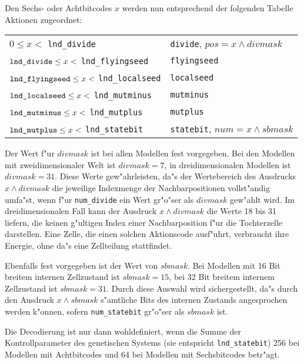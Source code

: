 Den Sechs- oder Achtbitcodes $x$ werden nun entsprechend der folgenden
Tabelle Aktionen zugeordnet:

\medskip
\begin{tabular}{l@{ $\rightarrow$ }l}
$0 \leq x <$ \verb|lnd_divide|                        & \verb|divide|, $pos = x \wedge \mathit{divmask}$ \\
$\verb|lnd_divide| \leq x <$ \verb|lnd_flyingseed|    & \verb|flyingseed| \\
$\verb|lnd_flyingseed| \leq x <$ \verb|lnd_localseed| & \verb|localseed| \\
$\verb|lnd_localseed| \leq x <$ \verb|lnd_mutminus|   & \verb|mutminus| \\
$\verb|lnd_mutminus| \leq x <$ \verb|lnd_mutplus|     & \verb|mutplus| \\
$\verb|lnd_mutplus| \leq x <$ \verb|lnd_statebit|     & \verb|statebit|, $num = x \wedge \mathit{sbmask}$ \\
\end{tabular}
\medskip

Der Wert f"ur $\mathit{divmask}$ ist bei allen Modellen fest vorgegeben. Bei
den Modellen mit zweidimensionaler Welt ist $\mathit{divmask} = 7$, in dreidimensionalen Modellen
ist $\mathit{divmask} = 31$. Diese Werte gew"ahrleisten, da"s der Wertebereich des Ausdrucks $x \wedge \mathit{divmask}$
die jeweilige Indexmenge der Nachbarpositionen vollst"andig umfa"st, wenn f"ur \verb|num_divide| ein
Wert gr"o"ser als $\mathit{divmask}$ gew"ahlt wird. Im dreidimensionalen Fall kann der Ausdruck
$x \wedge \mathit{divmask}$ die Werte 18 bis 31 liefern, die keinen g"ultigen Index einer Nachbarposition
f"ur die Tochterzelle darstellen. Eine Zelle, die einen solchen Aktionscode ausf"uhrt, verbraucht ihre
Energie, ohne da"s eine Zellteilung stattfindet.

Ebenfalls fest vorgegeben ist der Wert von $\mathit{sbmask}$. Bei Modellen mit 16 Bit breitem internen Zellzustand
ist $\mathit{sbmask} = 15$, bei 32 Bit breitem internem Zellzustand ist $\mathit{sbmask} = 31$. Durch diese Auswahl
wird sichergestellt, da"s durch den Ausdruck $x \wedge \mathit{sbmask}$ s"amtliche Bits des internen Zustands
angesprochen werden k"onnen, sofern \verb|num_statebit| gr"o"ser als $\mathit{sbmask}$ ist.

Die Decodierung ist nur dann wohldefiniert, wenn die Summe der Kontrollparameter des genetischen Systems
(sie entspricht \verb|lnd_statebit|) 256 bei Modellen mit Achtbitcodes und 64 bei
Modellen mit Sechsbitcodes betr"agt.

